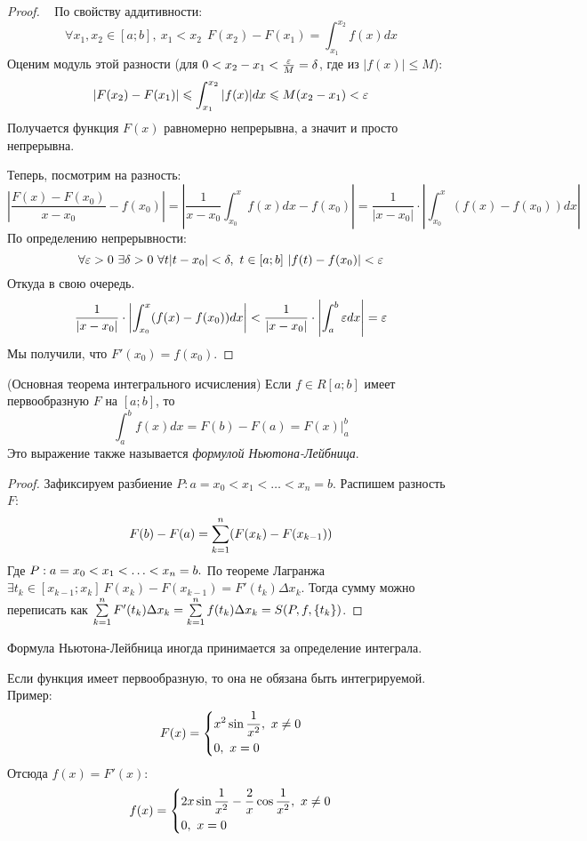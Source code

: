 \begin{proof}~
		По свойству аддитивности:
		\[
			\forall x_1, x_2 \in [a; b],\ x_1 < x_2\ \ F(x_2) - F(x_1) = \int_{x_1}^{x_2} f(x)dx
		\]
		Оценим модуль этой разности (для $0 < x_2 - x_1 < \frac{\varepsilon}{M} = \delta$, где из $|f(x)| \le M$):
		\[
			|F(x_2) - F(x_1)| \leqslant \int_{x_1}^{x_2} |f(x)|dx \leqslant M(x_2 - x_1) < \varepsilon
		\]
		Получается функция $F(x)$ равномерно непрерывна, а значит и просто непрерывна.
		
		Теперь, посмотрим на разность:
		\[
			\left|\frac{F(x) - F(x_0)}{x - x_0} - f(x_0)\right| = \left|\frac{1}{x - x_0} \int_{x_0}^x f(x)dx - f(x_0)\right| = \frac{1}{|x - x_0|} \cdot \left|\int_{x_0}^x (f(x) - f(x_0))dx\right|
		\]
		По определению непрерывности:
		\[
			\forall \varepsilon > 0\ \exists \delta > 0\ \forall t |t - x_0| < \delta ,\ t \in [a;b]\ |f(t) - f(x_0)| < \varepsilon
		\]
		Откуда в свою очередь.
		\[
			\frac{1}{|x - x_0|} \cdot \left|\int_{x_0}^x (f(x) - f(x_0))dx\right| < \frac{1}{|x - x_0|} \cdot \left|\int_a^b\varepsilon dx\right|  = \varepsilon
		\]
		Мы получили, что $F'(x_0) = f(x_0)$.
\end{proof}

\begin{theorem} (Основная теорема интегрального исчисления)
	Если $f \in R[a; b]$ имеет первообразную $F$ на $[a; b]$, то
	\[
		\int_a^b f(x)dx = F(b) - F(a) = F(x)\Big|_a^b
	\]
	Это выражение также называется \textit{формулой Ньютона-Лейбница}.
\end{theorem}

\begin{proof}
	Зафиксируем разбиение $P \colon a = x_0 < x_1 < \ldots < x_n = b$. Распишем разность $F$:
	\[
		F(b) - F(a) = \sum\limits_{k = 1}^n (F(x_k) - F(x_{k - 1}))
	\]
	Где $P: a = x_0 < x_1<\ldots< x_n = b.\\$
	По теореме Лагранжа $\exists t_k \in [x_{k - 1};x_k]\ F(x_k) - F(x_{k - 1}) = F'(t_k)\Delta x_k$. Тогда сумму можно переписать как $ \sum\limits_{k = 1}^nF'(t_k)\Delta x_k = \sum\limits_{k = 1}^nf(t_k)\Delta x_k = S(P, f, \{t_k\})$.
\end{proof}

\begin{note}
	Формула Ньютона-Лейбница иногда принимается за определение интеграла.
\end{note}

\begin{note}
	Если функция имеет первообразную, то она не обязана быть интегрируемой. Пример:
	\[
		F(x) = \left\{\begin{aligned}
			&{x^2 \sin \frac{1}{x^2},\ x \neq 0}
			\\
			&{0,\ x = 0}
		\end{aligned}\right.
	\]
	Отсюда $f(x) = F'(x)$:
	\[
		f(x) = \left\{\begin{aligned}
			&{2x \sin \frac{1}{x^2} - \frac{2}{x}\cos \frac{1}{x^2},\ x \neq 0}
			\\
			&{0,\ x = 0}
		\end{aligned}\right.
	\]
\end{note}